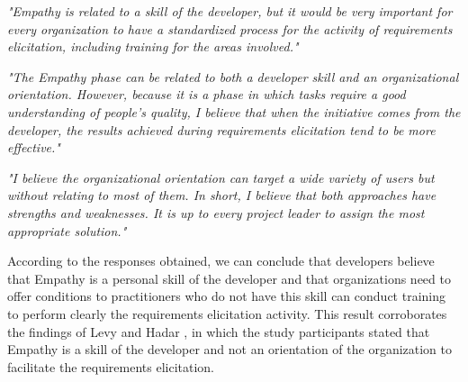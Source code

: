 \documentclass[conference]{IEEEtran}
\begin{document}
\begin{mq}
\emph{"Empathy is related to a skill of the developer, but it would be very important for every organization to have a standardized process for the activity of requirements elicitation, including training for the areas involved."}
\end{mq}

\begin{mq}
\emph{"The Empathy phase can be related to both a developer skill and an organizational orientation. However, because it is a phase in which tasks require a good understanding of people's quality, I believe that when the initiative comes from the developer, the results achieved during requirements elicitation tend to be more effective."}
\end{mq}

\begin{mq}
\emph{"I believe the organizational orientation can target a wide variety of users but without relating to most of them. In short, I believe that both approaches have strengths and weaknesses. It is up to every project leader to assign the most appropriate solution."}
\end{mq}


According to the responses obtained, we can conclude that developers believe that Empathy is a personal skill of the developer and that organizations need to offer conditions to practitioners who do not have this skill can conduct training to perform clearly the requirements elicitation activity. This result corroborates the findings of Levy and Hadar \cite{DBLP:conf/re/LevyH18}, in which the study participants stated that Empathy is a skill of the developer and not an orientation of the organization to facilitate the requirements elicitation.
\end{document}
